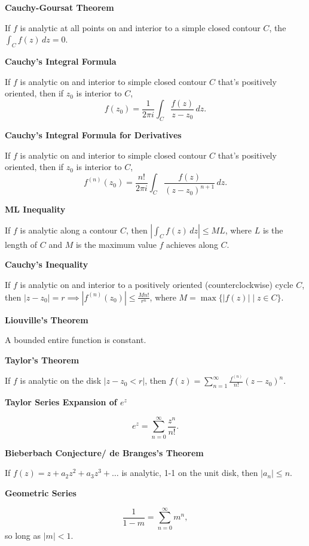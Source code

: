 \documentclass{article}
\begin{document}
\medskip\noindent\textbf{Cauchy-Goursat Theorem}

    If $f$ is analytic at all points on and interior to a simple closed contour $C$, the  $\int_Cf(z)\,dz=0$.

\medskip\noindent\textbf{Cauchy's Integral Formula}

    If $f$ is analytic on and interior to simple closed contour $C$ that's positively oriented, then if $z_0$ is interior to $C$, $$f(z_0) = \frac1{2\pi i}\int_C\frac{f(z)}{z-z_0}\,dz.$$

\medskip\noindent\textbf{Cauchy's Integral Formula for Derivatives}

    If $f$ is analytic on and interior to simple closed contour $C$ that's positively oriented, then if $z_0$ is interior to $C$, $$f^{(n)}(z_0) = \frac{n!}{2\pi i}\int_C\frac{f(z)}{(z-z_0)^{n+1}}\,dz.$$

\medskip\noindent\textbf{ML Inequality}

    If $f$ is analytic along a contour $C$, then $\left|\int_C f(z) \, dz\right| \leq ML$, where $L$ is the length of $C$ and $M$ is the maximum value $f$ achieves along $C$.

\medskip\noindent\textbf{Cauchy's Inequality}

    If $f$ is analytic on and interior to a positively oriented (counterclockwise) cycle $C$, then $|z-z_0| = r \implies |f^{(n)}(z_0)| \leq \frac{Mn!}{r^n}$, where $M = \max\{|f(z)| \mid z \in C\}$.

\medskip\noindent\textbf{Liouville's Theorem}

    A bounded entire function is constant.

\medskip\noindent\textbf{Taylor's Theorem}

    If $f$ is analytic on the disk $|z-z_0 < r|$, then $f(z) = \sum_{n=1}^\infty\frac{f^{(n)}}{n!}(z-z_0)^n$.
    
\medskip\noindent\textbf{Taylor Series Expansion of $e^z$}

    $$e^z = \sum_{n=0}^\infty \frac{z^n}{n!}.$$

\medskip\noindent\textbf{Bieberbach Conjecture/ de Branges's Theorem}

    If $f(z) = z + a_2z^2 + a_3z^3 + \hdots$ is analytic, 1-1 on the unit disk, then $|a_n| \leq n$.

\medskip\noindent\textbf{Geometric Series}

    $$\frac1{1-m} = \sum_{n=0}^\infty m^n,$$ so long as $|m| < 1$.
\end{document}
